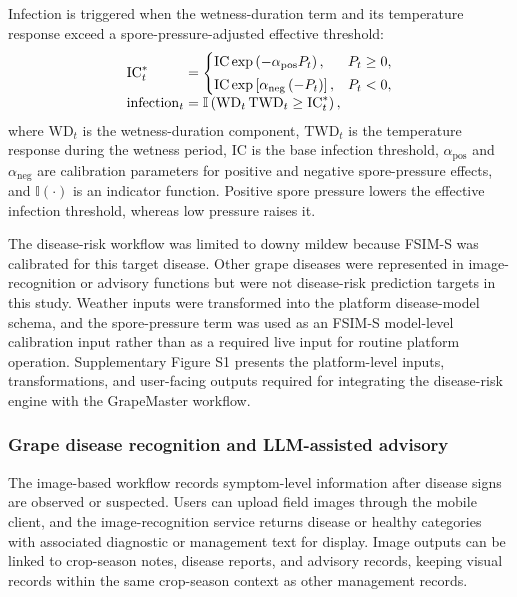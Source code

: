 \documentclass[12pt]{article}
\begin{document}
Infection is triggered when the wetness-duration term and its temperature response exceed a spore-pressure-adjusted effective threshold:
\begin{equation}
\begin{array}{l@{\;}c@{\;}l}
\displaystyle \mathrm{IC}_t^{*}
&=&
\displaystyle
\begin{cases}
\mathrm{IC}\exp\left(-\alpha_{\mathrm{pos}}P_t\right),
& P_t \geq 0,\\[2pt]
\mathrm{IC}\exp\left[\alpha_{\mathrm{neg}}\left(-P_t\right)\right],
& P_t < 0,
\end{cases}\\[8pt]
\displaystyle \mathrm{infection}_t
&=&
\displaystyle \mathbb{I}\left(\mathrm{WD}_t\,\mathrm{TWD}_t \geq \mathrm{IC}_t^{*}\right),
\end{array}
\label{eq:fsims_threshold}
\end{equation}
where \(\mathrm{WD}_t\) is the wetness-duration component, \(\mathrm{TWD}_t\) is the temperature response during the wetness period, \(\mathrm{IC}\) is the base infection threshold, \(\alpha_{\mathrm{pos}}\) and \(\alpha_{\mathrm{neg}}\) are calibration parameters for positive and negative spore-pressure effects, and \(\mathbb{I}(\cdot)\) is an indicator function. Positive spore pressure lowers the effective infection threshold, whereas low pressure raises it.

The disease-risk workflow was limited to downy mildew because FSIM-S was calibrated for this target disease. Other grape diseases were represented in image-recognition or advisory functions but were not disease-risk prediction targets in this study. Weather inputs were transformed into the platform disease-model schema, and the spore-pressure term was used as an FSIM-S model-level calibration input rather than as a required live input for routine platform operation. Supplementary Figure S1 presents the platform-level inputs, transformations, and user-facing outputs required for integrating the disease-risk engine with the GrapeMaster workflow.

\subsubsection{Grape disease recognition and LLM-assisted advisory}\label{grape-disease-recognition-and-bounded-llm-advisory}

The image-based workflow records symptom-level information after disease signs are observed or suspected. Users can upload field images through the mobile client, and the image-recognition service returns disease or healthy categories with associated diagnostic or management text for display. Image outputs can be linked to crop-season notes, disease reports, and advisory records, keeping visual records within the same crop-season context as other management records.
\end{document}
